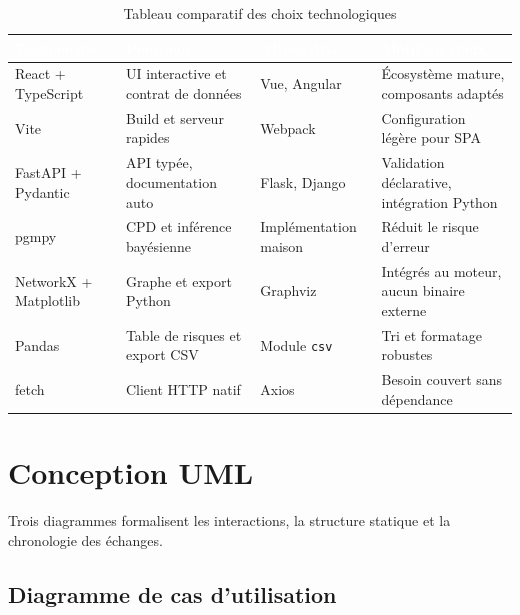 \documentclass[12pt,a4paper]{article}
\newcommand{\forcereset}[1]{}
\begin{document}
\begin{table}[H]
\centering
\caption{Tableau comparatif des choix technologiques}
\label{tab:technologies}
\setlength{\tabcolsep}{10pt}
\begin{tabular}{>{\raggedright\arraybackslash}p{3.2cm} >{\raggedright\arraybackslash}p{3.5cm} >{\raggedright\arraybackslash}p{3.2cm} >{\raggedright\arraybackslash}p{3.5cm}}
\toprule
\rowcolor{primary}
\textcolor{white}{\textbf{Technologie}} & \textcolor{white}{\textbf{Pourquoi}} & \textcolor{white}{\textbf{Alternative}} & \textcolor{white}{\textbf{Motif du choix}} \\
\midrule
React + TypeScript & UI interactive et contrat de données & Vue, Angular & Écosystème mature, composants adaptés \\
Vite & Build et serveur rapides & Webpack & Configuration légère pour SPA \\
FastAPI + Pydantic & API typée, documentation auto & Flask, Django & Validation déclarative, intégration Python \\
pgmpy & CPD et inférence bayésienne & Implémentation maison & Réduit le risque d'erreur \\
NetworkX + Matplotlib & Graphe et export Python & Graphviz & Intégrés au moteur, aucun binaire externe \\
Pandas & Table de risques et export CSV & Module \texttt{csv} & Tri et formatage robustes \\
fetch & Client HTTP natif & Axios & Besoin couvert sans dépendance \\
\bottomrule
\end{tabular}
\end{table}

\section{Conception UML}
\forcereset{6}

Trois diagrammes formalisent les interactions, la structure statique et la chronologie des échanges.

\subsection{Diagramme de cas d'utilisation}
\forcereset{8}
\end{document}
